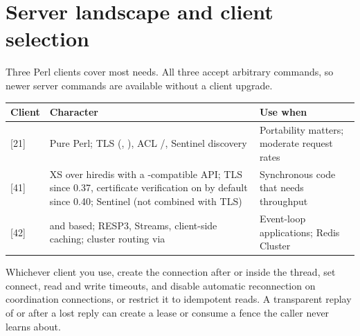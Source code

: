 \section{Server landscape and client selection}\label{sec:redis-clients}
Three Perl clients cover most needs. All three accept arbitrary commands, so newer server commands are available without a client upgrade.
\begin{longtable}{L{.22\linewidth}L{.40\linewidth}L{.30\linewidth}}
\toprule Client & Character & Use when \\ \midrule\endhead
{} [21] & Pure Perl; TLS (, ), ACL /, Sentinel discovery & Portability matters; moderate request rates \\
 [41] & XS over hiredis with a -compatible API; TLS since 0.37, certificate verification on by default since 0.40; Sentinel (not combined with TLS) & Synchronous code that needs throughput \\
 [42] &  and  based; RESP3, Streams, client-side caching; cluster routing via  & Event-loop applications; Redis Cluster \\
\bottomrule\end{longtable}
Whichever client you use, create the connection after  or inside the thread, set connect, read and write timeouts, and disable automatic reconnection on coordination connections, or restrict it to idempotent reads. A transparent replay of  or  after a lost reply can create a lease or consume a fence the caller never learns about.

